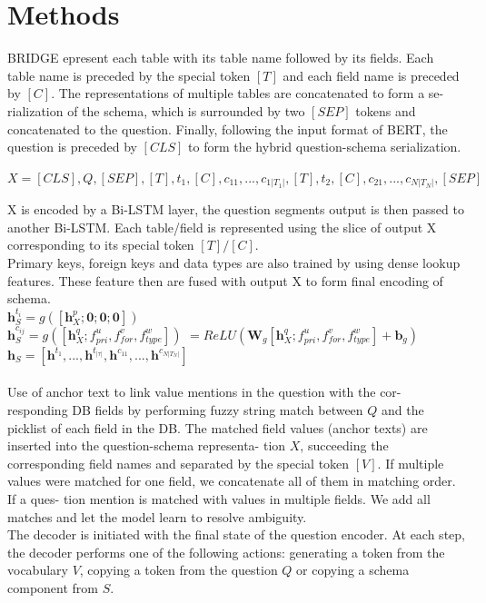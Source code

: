 \documentclass[10pt,a4paper]{article}
\begin{document}
\section{Methods}
BRIDGE epresent each table with
its table name followed by its fields. Each table
name is preceded by the special token $[T]$ and each
field name is preceded by $[C]$. The representations
of multiple tables are concatenated to form a se-
rialization of the schema, which is surrounded by
two $[SEP]$ tokens and concatenated to the question.
Finally, following the input format of BERT, the
question is preceded by $[CLS]$ to form the hybrid
question-schema serialization.
\begin{center}
$X = [CLS],Q,[SEP],[T],t_{1},[C],c_{11},...,c_{1|T_1|},[T],t_{2},[C],c_{21},...,c_{N|T_N|},[SEP]$
\end{center}
X is encoded by a Bi-LSTM layer, the question segments output is then passed to another Bi-LSTM. Each table/field is represented
using the slice of output X corresponding to its special
token $[T]/[C]$.\\
Primary keys, foreign keys and data types are also trained by using dense lookup features. These feature then are fused with output X to form final encoding of schema.\\
$\textbf{h}^{t_{i}}_{S} = g([\textbf{h}^{p}_{X};\textbf{0};\textbf{0};\textbf{0}])$ \\
$\textbf{h}^{c_{ij}}_{S} = g([\textbf{h}^{q}_{X};f^{u}_{pri},f^{v}_{for},f^{w}_{type}])$  $=ReLU(\textbf{W}_{g}[\textbf{h}^{q}_{X};f^{u}_{pri},f^{v}_{for},f^{w}_{type}]+\textbf{b}_{g})$\\
$\textbf{h}_{S} = [\textbf{h}^{t_{1}},...,\textbf{h}^{t_{|\tau|}},\textbf{h}^{c_{11}},...,\textbf{h}^{c_{N|T_{N}|}}]$\\\\
Use of anchor text
to link value mentions in the question with the cor-
responding DB fields by performing fuzzy string
match between $Q$ and the picklist of each field in
the DB. The matched field values (anchor texts)
are inserted into the question-schema representa-
tion $X$, succeeding the corresponding field names
and separated by the special token $[V]$. If multiple
values were matched for one field, we concatenate
all of them in matching order. If a ques-
tion mention is matched with values in multiple
fields. We add all matches and let the model learn
to resolve ambiguity. \\ 
The decoder is initiated with the final state of the question encoder. At each step, the decoder performs one of the following actions: generating a token from the vocabulary $V$, copying a token from the question $Q$ or copying a schema component from $S$.\\
\end{document}
